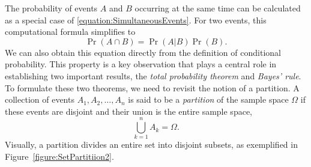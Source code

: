 The probability of events $A$ and $B$ occurring at the same time can be calculated as a special case of \eqref{equation:SimultaneousEvents}.
For two events, this computational formula simplifies to
\begin{equation} \label{equation:ProbabilityIntersection}
\Pr (A \cap B) = \Pr (A|B) \Pr (B) .
\end{equation}
We can also obtain this equation directly from the definition of conditional probability.
This property is a key observation that plays a central role in establishing two important results, the \emph{total probability theorem} and \emph{Bayes' rule}.
To formulate these two theorems, we need to revisit the notion of a partition.
A collection of events $A_1, A_2, \ldots, A_n$ is said to be a \emph{partition} of the sample space $\Omega$ if these events are disjoint and their union is the entire sample space, 
\begin{equation*}
\bigcup_{k=1}^n A_k = \Omega .
\end{equation*}
Visually, a partition divides an entire set into disjoint subsets, as exemplified in Figure~\ref{figure:SetPartitiion2}.

